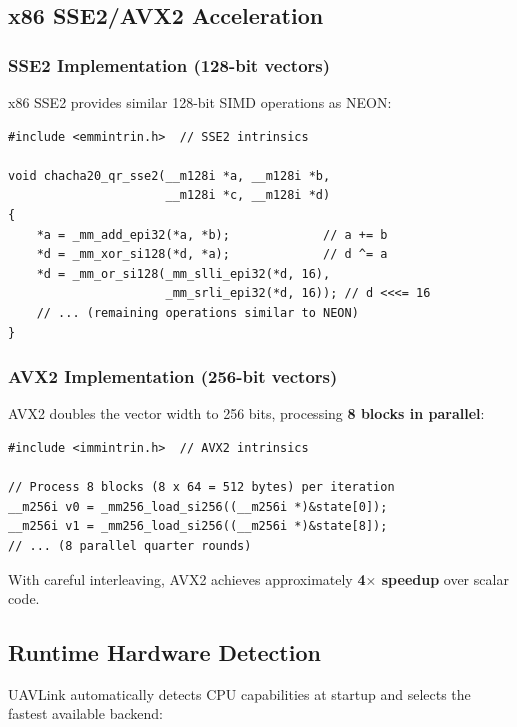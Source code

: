 \documentclass[11pt,a4paper]{article}
\begin{document}
\subsection{x86 SSE2/AVX2 Acceleration}

\subsubsection{SSE2 Implementation (128-bit vectors)}

x86 SSE2 provides similar 128-bit SIMD operations as NEON:

\begin{lstlisting}[caption={x86 SSE2 Quarter Round Skeleton}]
#include <emmintrin.h>  // SSE2 intrinsics

void chacha20_qr_sse2(__m128i *a, __m128i *b, 
                      __m128i *c, __m128i *d)
{
    *a = _mm_add_epi32(*a, *b);             // a += b
    *d = _mm_xor_si128(*d, *a);             // d ^= a
    *d = _mm_or_si128(_mm_slli_epi32(*d, 16), 
                      _mm_srli_epi32(*d, 16)); // d <<<= 16
    // ... (remaining operations similar to NEON)
}
\end{lstlisting}

\subsubsection{AVX2 Implementation (256-bit vectors)}

AVX2 doubles the vector width to 256 bits, processing \textbf{8 blocks in parallel}:

\begin{lstlisting}[caption={AVX2 Processing 8 ChaCha20 Blocks Simultaneously}]
#include <immintrin.h>  // AVX2 intrinsics

// Process 8 blocks (8 x 64 = 512 bytes) per iteration
__m256i v0 = _mm256_load_si256((__m256i *)&state[0]);
__m256i v1 = _mm256_load_si256((__m256i *)&state[8]);
// ... (8 parallel quarter rounds)
\end{lstlisting}

With careful interleaving, AVX2 achieves approximately \textbf{4$\times$ speedup} over scalar code.

\subsection{Runtime Hardware Detection}

UAVLink automatically detects CPU capabilities at startup and selects the fastest available backend:
\end{document}
